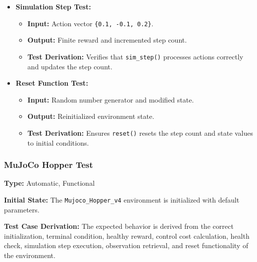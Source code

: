 \documentclass[12pt, titlepage]{article}
\begin{document}
\begin{itemize}
    \item \textbf{Simulation Step Test:}
    \begin{itemize}
        \item \textbf{Input:} Action vector \texttt{\{0.1, -0.1, 0.2\}}.
        \item \textbf{Output:} Finite reward and incremented step count.
        \item \textbf{Test Derivation:} Verifies that \texttt{sim\_step()} processes actions correctly and updates the step count.
    \end{itemize}

    \item \textbf{Reset Function Test:}
    \begin{itemize}
        \item \textbf{Input:} Random number generator and modified state.
        \item \textbf{Output:} Reinitialized environment state.
        \item \textbf{Test Derivation:} Ensures \texttt{reset()} resets the step count and state values to initial conditions.
    \end{itemize}
\end{itemize}


\subsubsection{MuJoCo Hopper Test}

\textbf{Type:} Automatic, Functional

\textbf{Initial State:} The \texttt{Mujoco\_Hopper\_v4} environment is initialized with default parameters.

\textbf{Test Case Derivation:} The expected behavior is derived from the correct initialization, terminal condition, healthy reward, control cost calculation, health check, simulation step execution, observation retrieval, and reset functionality of the environment.
\end{document}

